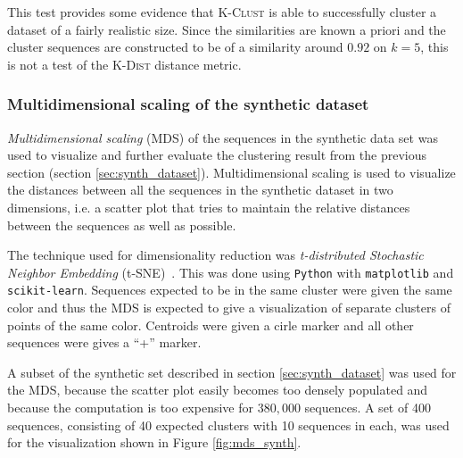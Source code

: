 
This test provides some evidence that \textsc{K-Clust} is able to successfully
cluster a dataset of a fairly realistic size. Since the similarities are known
a priori and the cluster sequences are constructed to be of a similarity around
$0.92$ on $k=5$, this is not a test of the \textsc{K-Dist} distance metric.


\subsubsection{Multidimensional scaling of the synthetic dataset}
\label{sec:mds_synth}

\emph{Multidimensional scaling} (MDS) of the sequences in the synthetic data
set was used to visualize and further evaluate the clustering result from the
previous section (section \ref{sec:synth_dataset}). Multidimensional scaling
is used to visualize the distances between all the sequences in the synthetic
dataset in two dimensions, i.e. a scatter plot that tries to maintain the
relative distances between the sequences as well as possible.

The technique used for dimensionality reduction was \emph{t-distributed
Stochastic Neighbor Embedding} (t-SNE)~\cite{maaten}. This was done using
\texttt{Python} with \texttt{matplotlib} and \texttt{scikit-learn}. Sequences
expected to be in the same cluster were given the same color and thus the MDS
is expected to give a visualization of separate clusters of points of the same
color. Centroids were given a cirle marker and all other sequences were gives a
``+'' marker.

A subset of the synthetic set described in section \ref{sec:synth_dataset} was
used for the MDS, because the scatter plot easily becomes too densely populated
and because the computation is too expensive for $380,000$ sequences. A set of
400 sequences, consisting of 40 expected clusters with 10 sequences in each,
was used for the visualization shown in Figure \ref{fig:mds_synth}.

